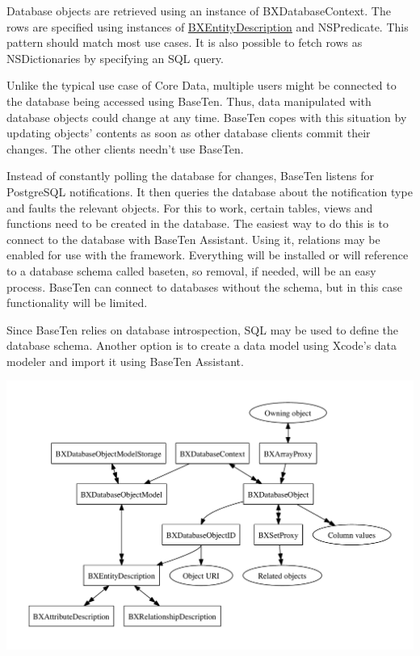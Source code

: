 Database objects are retrieved using an instance of B\+X\+Database\+Context. The rows are specified using instances of \hyperlink{interface_b_x_entity_description}{B\+X\+Entity\+Description} and N\+S\+Predicate. This pattern should match most use cases. It is also possible to fetch rows as N\+S\+Dictionaries by specifying an S\+Q\+L query.

Unlike the typical use case of Core Data, multiple users might be connected to the database being accessed using Base\+Ten. Thus, data manipulated with database objects could change at any time. Base\+Ten copes with this situation by updating objects' contents as soon as other database clients commit their changes. The other clients needn't use Base\+Ten.

Instead of constantly polling the database for changes, Base\+Ten listens for Postgre\+S\+Q\+L notifications. It then queries the database about the notification type and faults the relevant objects. For this to work, certain tables, views and functions need to be created in the database. The easiest way to do this is to connect to the database with Base\+Ten Assistant. Using it, relations may be enabled for use with the framework. Everything will be installed or will reference to a database schema called baseten, so removal, if needed, will be an easy process. Base\+Ten can connect to databases without the schema, but in this case functionality will be limited.

Since Base\+Ten relies on database introspection, S\+Q\+L may be used to define the database schema. Another option is to create a data model using Xcode's data modeler and import it using Base\+Ten Assistant.


\begin{DoxyImage}
\includegraphics[width=\textwidth]{object-relationships}
\caption{Relationships between Base\+Ten's objects}
\end{DoxyImage}
 
